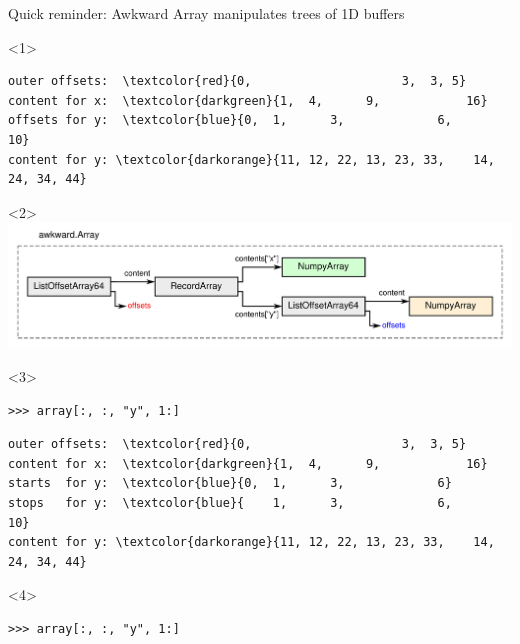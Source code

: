 \documentclass[aspectratio=169]{beamer}
\begin{document}
\begin{frame}[fragile]{Quick reminder: Awkward Array manipulates trees of 1D buffers}
\begin{onlyenv}<1>
\vspace{0.25 cm}
\begin{Verbatim}[commandchars=\\\{\}]
outer offsets:  \textcolor{red}{0,                     3,  3, 5}
content for x:  \textcolor{darkgreen}{1,  4,      9,            16}
offsets for y:  \textcolor{blue}{0,  1,      3,             6,            10}
content for y: \textcolor{darkorange}{11, 12, 22, 13, 23, 33,    14, 24, 34, 44}
\end{Verbatim}
\vspace{5 cm}
\end{onlyenv}\begin{onlyenv}<2>
\includegraphics[width=\linewidth]{example-hierarchy.pdf}
\vspace{5 cm}
\end{onlyenv}\begin{onlyenv}<3>
\vspace{0.25 cm}
\begin{verbatim}
>>> array[:, :, "y", 1:]
\end{verbatim}

\vspace{0.25 cm}
\begin{Verbatim}[commandchars=\\\{\}]
outer offsets:  \textcolor{red}{0,                     3,  3, 5}
content for x:  \textcolor{darkgreen}{1,  4,      9,            16}
starts  for y:  \textcolor{blue}{0,  1,      3,             6}
stops   for y:  \textcolor{blue}{    1,      3,             6,            10}
content for y: \textcolor{darkorange}{11, 12, 22, 13, 23, 33,    14, 24, 34, 44}
\end{Verbatim}
\vspace{5 cm}
\end{onlyenv}\begin{onlyenv}<4>
\vspace{0.25 cm}
\begin{verbatim}
>>> array[:, :, "y", 1:]
\end{verbatim}


\end{onlyenv}
\end{frame}
\end{document}
